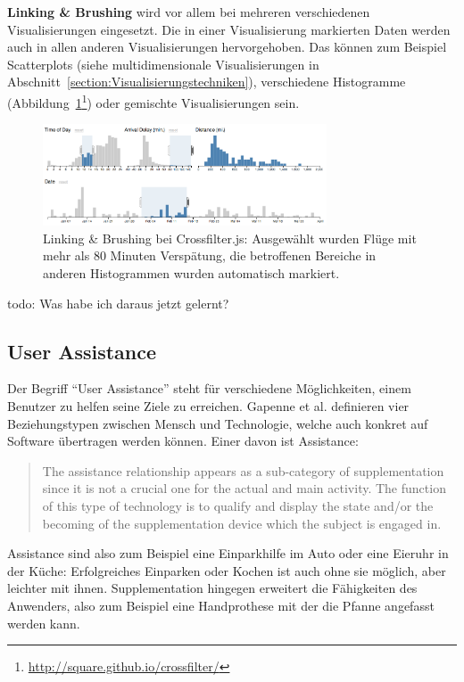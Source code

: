 \documentclass[
	headsepline,
	footsepline,
	fontsize=12pt,
	bibliography=totoc
]{scrbook}
\begin{document}
\textbf{Linking \& Brushing} wird vor allem bei mehreren verschiedenen Visualisierungen eingesetzt. Die in einer Visualisierung markierten Daten werden auch in allen anderen Visualisierungen hervorgehoben. Das können zum Beispiel Scatterplots (siehe multidimensionale Visualisierungen in Abschnitt~\ref{section:Visualisierungstechniken}), verschiedene Histogramme (Abbildung~\ref{figure:link_brush}\footnote{\url{http://square.github.io/crossfilter/}}) oder gemischte Visualisierungen sein.

\begin{figure}[htbp]
   \centering
   \includegraphics[width=0.75\textwidth]{images/grundlagen-link_brush.png}
   \caption{Linking \& Brushing bei Crossfilter.js: Ausgewählt wurden Flüge mit mehr als 80 Minuten Verspätung, die betroffenen Bereiche in anderen Histogrammen wurden automatisch markiert.}
   \label{figure:link_brush}
\end{figure}

todo: Was habe ich daraus jetzt gelernt?

\subsection{User Assistance}
\label{section:user_assistance}


Der Begriff \enquote{User Assistance} steht für verschiedene Möglichkeiten, einem Benutzer zu helfen seine Ziele zu erreichen. Gapenne et al. \cite{Gapenne2002} definieren vier Beziehungstypen zwischen Mensch und Technologie, welche auch konkret auf Software übertragen werden können. Einer davon ist Assistance:

\begin{quote}
The assistance relationship appears as a sub-category of supplementation since it is not a crucial one for the actual and main activity. The function of this type of technology is to qualify and display the state and/or the becoming of the supplementation device which the subject is engaged in.
\end{quote}

Assistance sind also zum Beispiel eine Einparkhilfe im Auto oder eine Eieruhr in der Küche: Erfolgreiches Einparken oder Kochen ist auch ohne sie möglich, aber leichter mit ihnen. Supplementation hingegen erweitert die Fähigkeiten des Anwenders, also zum Beispiel eine Handprothese mit der die Pfanne angefasst werden kann.
\end{document}
